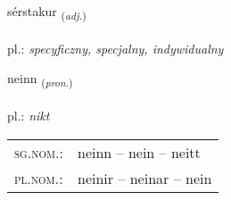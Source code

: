 \documentclass[frontgrid, backgrid]{flacards}\usepackage[]{graphicx}\usepackage[]{xcolor}
\begin{document}
\renewcommand{\flhead}{\vskip5pt \fboxsep=0pt {\small\bfseries\footnotesize Lýsingarorð | przymiotnik}}
\renewcommand{\fcfoot}{\vskip5pt \fboxsep=0pt \hspace{2pt}{\small\bfseries\footnotesize 1K}}

\renewcommand{\blhead}{\vskip5pt {\small\bfseries\footnotesize Lýsingarorð | przymiotnik }}
\renewcommand{\bcfoot}{\vskip5pt \hspace{2pt}{\small\bfseries\footnotesize 1K}}


{sérstakur \small{\textsubscript{(\textit{adj.})}} \\[1ex] %
 \\
pl.: \emph{specyficzny, specjalny, indywidualny} \\  [2ex]
\renewcommand*{\arraystretch}{0.8}
}

\renewcommand{\flhead}{\vskip5pt \fboxsep=0pt {\small\bfseries\footnotesize Fornafn | zaimek}}
\renewcommand{\fcfoot}{\vskip5pt \fboxsep=0pt \hspace{2pt}{\small\bfseries\footnotesize 1K}}

\renewcommand{\blhead}{\vskip5pt {\small\bfseries\footnotesize Fornafn | zaimek }}
\renewcommand{\bcfoot}{\vskip5pt \hspace{2pt}{\small\bfseries\footnotesize 1K}}


{neinn \small{\textsubscript{(\textit{pron.})}} \\[1ex] %
\textphonetic{[neitn̥]} \\
pl.: \emph{nikt} \\  [2ex]
\renewcommand*{\arraystretch}{0.8}
\begin{tabular}{ll}
\textsc{sg.nom.}: & neinn  --  nein -- neitt \\ 
\textsc{pl.nom.}: & neinir -- neinar -- nein
\end{tabular}
}
\end{document}
